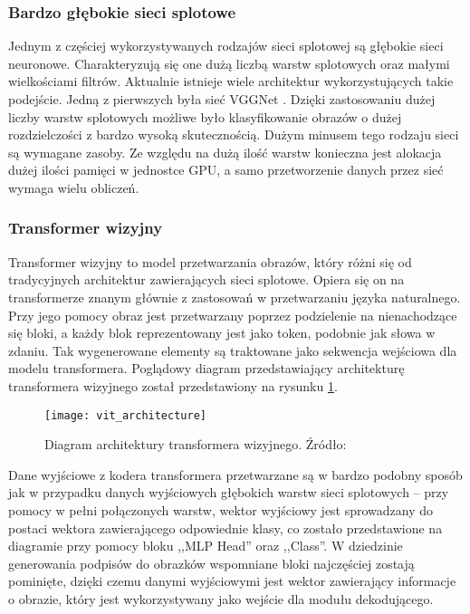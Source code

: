 \subsubsection{Bardzo głębokie sieci splotowe}
Jednym z częściej wykorzystywanych rodzajów sieci splotowej są głębokie sieci neuronowe. Charakteryzują się one dużą liczbą warstw splotowych oraz małymi wielkościami filtrów. Aktualnie istnieje wiele architektur wykorzystujących takie podejście. Jedną z pierwszych była sieć VGGNet \cite{vggnet}. Dzięki zastosowaniu dużej liczby warstw splotowych możliwe było klasyfikowanie obrazów o dużej rozdzielczości z bardzo wysoką skutecznością. Dużym minusem tego rodzaju sieci są wymagane zasoby. Ze względu na dużą ilość warstw konieczna jest alokacja dużej ilości pamięci w jednostce GPU, a samo przetworzenie danych przez sieć wymaga wielu obliczeń.
\subsubsection{Transformer wizyjny}
Transformer wizyjny \cite{vit} to model przetwarzania obrazów, który różni się od tradycyjnych architektur zawierających sieci splotowe. Opiera się on na transformerze znanym głównie z zastosowań w przetwarzaniu języka naturalnego. Przy jego pomocy obraz jest przetwarzany poprzez podzielenie na nienachodzące się bloki, a każdy blok reprezentowany jest jako token, podobnie jak słowa w zdaniu. Tak wygenerowane elementy są traktowane jako sekwencja wejściowa dla modelu transformera. Poglądowy diagram przedstawiający architekturę transformera wizyjnego został przedstawiony na rysunku \ref{fig:vit-architecture}.
\begin{figure}[H]
  \centering
  \texttt{[image: vit\_architecture]}
  \caption{Diagram architektury transformera wizyjnego. Źródło: \cite{vit}}
  \label{fig:vit-architecture}
\end{figure}
\noindent Dane wyjściowe z kodera transformera przetwarzane są w bardzo podobny sposób jak w przypadku danych wyjściowych głębokich warstw sieci splotowych -- przy pomocy w pełni połączonych warstw, wektor wyjściowy jest sprowadzany do postaci wektora zawierającego odpowiednie klasy, co zostało przedstawione na diagramie przy pomocy bloku ,,MLP Head'' oraz ,,Class''. W dziedzinie generowania podpisów do obrazków wspomniane bloki najczęściej zostają pominięte, dzięki czemu danymi wyjściowymi jest wektor zawierający informacje o obrazie, który jest wykorzystywany jako wejście dla modułu dekodującego.
